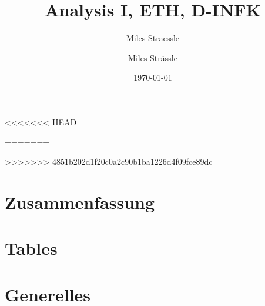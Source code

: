 \documentclass[11pt]{article}
\begin{document}
	
\setcounter{page}{1}
\setcounter{tocdepth}{2}

\title{Analysis I, ETH, D-INFK}
<<<<<<< HEAD
\author{Miles Straessle}
=======
\author{Miles Strässle}
>>>>>>> 4851b202d1f20c0a2c90b1ba1226d4f09fce89dc
\date{\today}
\maketitle


% 



\part{Zusammenfassung}




%




\part{Tables}


%
%

\part{Generelles}



\end{document}
